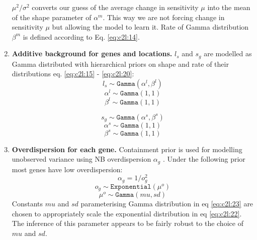 \documentclass[11pt,a4paper]{article}
\begin{document}
\begin{enumerate}
    $\mu ^ 2 / \sigma ^ 2$ converts our guess of the average change in sensitivity $\mu$ into the mean of the shape parameter of $\alpha^m$. This way we are not forcing change in sensitivity $\mu$ but allowing the model to learn it. Rate of Gamma distribution $\beta^m$ is defined according to Eq. \ref{eq:c2l:14}.
    
    \item \textbf{Additive background for genes and locations.} $l_s$ and $s_{g}$ are modelled as Gamma distributed with hierarchical priors on shape and rate of their distributions eq. \ref{eq:c2l:15} - \ref{eq:c2l:20}:
    \begin{equation} \label{eq:c2l:15}
    l_s \sim \mathtt{Gamma}(\alpha^l,  \beta^l)
    \end{equation}
    \begin{equation} \label{eq:c2l:16}
    \alpha^l \sim \mathtt{Gamma}(1, 1)
    \end{equation}
    \begin{equation} \label{eq:c2l:17}
    \beta^l \sim \mathtt{Gamma}(1, 1)
    \end{equation}
    
    \begin{equation} \label{eq:c2l:18}
    s_{g} \sim \mathtt{Gamma}(\alpha^s,  \beta^s)
    \end{equation}
    \begin{equation} \label{eq:c2l:19}
    \alpha^s \sim \mathtt{Gamma}(1, 1)
    \end{equation}
    \begin{equation} \label{eq:c2l:20}
    \beta^s \sim \mathtt{Gamma}(1, 1)
    \end{equation}
    
    \item \textbf{Overdispersion for each gene.} Containment prior is used for modelling unobserved variance using NB overdispersion $\alpha_g$ \cite{simpson_penalising_2017}. Under the following prior most genes have low overdispersion:
    \begin{equation} \label{eq:c2l:21}
    \alpha_g = 1 / o_g ^ 2
    \end{equation}
    \begin{equation} \label{eq:c2l:22}
    o_g \sim \mathtt{Exponential}(\mu^o)
    \end{equation}
    \begin{equation} \label{eq:c2l:23}
    \mu^o \sim \mathtt{Gamma}(mu,  sd)
    \end{equation}
    Constants $mu$ and $sd$ parameterising Gamma distribution in eq \ref{eq:c2l:23} are chosen to appropriately scale the exponential distribution in eq \ref{eq:c2l:22}. The inference of this parameter appears to be fairly robust to the choice of $mu$ and $sd$.\newline

\end{enumerate}
\end{document}
